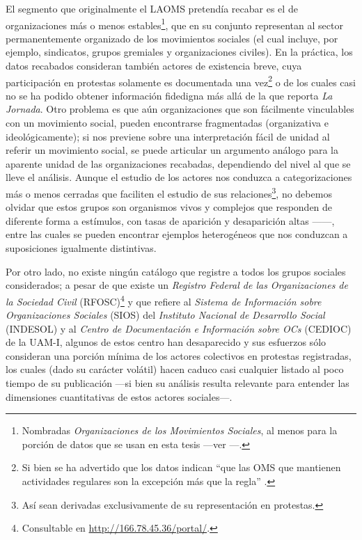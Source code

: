 \documentclass[letterpaper, 11pt]{book}
\theoremstyle{definition}
\theoremstyle{remark}
\begin{document}
El segmento que originalmente el LAOMS pretendía recabar es el de organizaciones más o menos estables\footnote{
    Nombradas \emph{Organizaciones de los Movimientos Sociales}, al menos para la porción de datos que se usan en esta tesis ---ver ---.
}, que en su conjunto representan al sector permanentemente organizado de los movimientos sociales (el cual incluye, por ejemplo, sindicatos, grupos gremiales y organizaciones civiles).  
En la práctica, los datos recabados consideran también actores de existencia breve, cuya participación en protestas solamente es documentada una vez\footnote{
    Si bien se ha advertido que los datos indican ``que las OMS que mantienen actividades regulares son la excepción más que la regla'' \citep[13]{2016_Cadena_OMS}.
} 
o de los cuales casi no se ha podido obtener información fidedigna más allá de la que reporta \emph{La Jornada}. 
Otro problema es que aún organizaciones que son fácilmente vinculables con un movimiento social, pueden encontrarse fragmentadas (organizativa e ideológicamente); si \citet{2016_Cadena_OMS} nos previene sobre una interpretación fácil de unidad al referir un movimiento social, se puede articular un argumento análogo para la aparente unidad de las organizaciones recabadas, dependiendo del nivel al que se lleve el análisis. 
Aunque el estudio de los actores nos conduzca a categorizaciones más o menos cerradas que faciliten el estudio de sus relaciones\footnote{
    Así sean derivadas exclusivamente de su representación en protestas.
}, no debemos olvidar que estos grupos son organismos vivos y complejos que responden de diferente forma a estímulos, con tasas de aparición y desaparición altas ---\citet{2015_Calvillo_DimensionesOC}---, entre las cuales se pueden encontrar ejemplos heterogéneos que nos conduzcan a suposiciones igualmente distintivas. 


Por otro lado, no existe ningún catálogo que registre a todos los grupos sociales considerados; a pesar de que existe un \emph{Registro Federal de las Organizaciones de la Sociedad Civil} (RFOSC)\footnote{
    Consultable en \url{http://166.78.45.36/portal/}.
} y que \citet{2015_Calvillo_DimensionesOC} refiere al \emph{Sistema de Información sobre Organizaciones Sociales} (SIOS) del \emph{Instituto Nacional de Desarrollo Social} (INDESOL) y al \emph{Centro de Documentación e Información sobre OCs} (CEDIOC) de la UAM-I, algunos de estos centro han desaparecido y sus esfuerzos sólo consideran una porción mínima de los actores colectivos en protestas registradas, los cuales (dado su carácter volátil) hacen caduco casi cualquier listado al poco tiempo de su publicación ---si bien su análisis resulta relevante para entender las dimensiones cuantitativas de estos actores sociales---.
\end{document}
